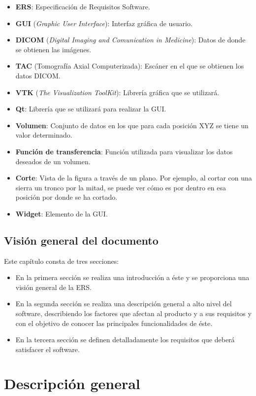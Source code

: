 \begin{itemize}
	\item \textbf{ERS}: Especificación de Requisitos Software.
	\item \textbf{GUI} (\textit{Graphic User Interface}): Interfaz gráfica de usuario.
	\item \textbf{DICOM} (\textit{Digital Imaging and Comunication in Medicine}): Datos de donde se obtienen las imágenes.
	\item \textbf{TAC} (Tomografía Axial Computerizada): Escáner en el que se obtienen los datos DICOM.
	\item \textbf{VTK} (\textit{The Visualization ToolKit}): Librería gráfica que se utilizará.
	\item \textbf{Qt}: Librería que se utilizará para realizar la GUI.
	\item \textbf{Volumen}: Conjunto de datos en los que para cada posición XYZ se tiene un valor determinado.
	\item \textbf{Función de transferencia}: Función utilizada para visualizar los datos deseados de un volumen.
	\item \textbf{Corte}: Vista de la figura a través de un plano. Por ejemplo, al cortar con una sierra un tronco por la mitad, se puede ver cómo es por dentro en esa posición por donde se ha cortado.
	\item \textbf{Widget}: Elemento de la GUI.
\end{itemize}

\subsection{Visión general del documento}

Este capítulo consta de tres secciones:
\begin{itemize}
	\item En la primera sección se realiza una introducción a éste y se proporciona una visión general de la ERS.
	\item En la segunda sección se realiza una descripción general a alto nivel del software, describiendo los factores que afectan al producto y a sus requisitos y con el objetivo de conocer las principales funcionalidades de éste.
	\item En la tercera sección se definen detalladamente los requisitos que deberá satisfacer el software.
\end{itemize}

\section{Descripción general}

